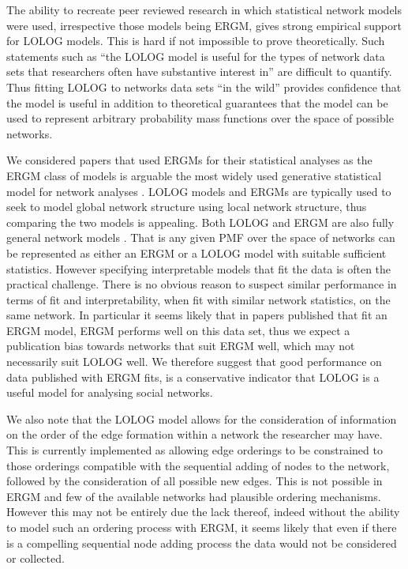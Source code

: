 \documentclass[
]{statsoc}
\begin{document}
The ability to recreate peer reviewed research in which statistical
network models were used, irrespective those models being ERGM, gives
strong empirical support for LOLOG models. This is hard if not
impossible to prove theoretically. Such statements such as ``the LOLOG
model is useful for the types of network data sets that researchers
often have substantive interest in'' are difficult to quantify. Thus
fitting LOLOG to networks data sets ``in the wild'' provides confidence
that the model is useful in addition to theoretical guarantees that the
model can be used to represent arbitrary probability mass functions over
the space of possible networks.

We considered papers that used ERGMs for their statistical analyses as
the ERGM class of models is arguable the most widely used generative
statistical model for network analyses \citep{Amati2018}. LOLOG models
and ERGMs are typically used to seek to model global network structure
using local network structure, thus comparing the two models is
appealing. Both LOLOG and ERGM are also fully general network models
\citep{Fellows2018}. That is any given PMF over the space of networks
can be represented as either an ERGM or a LOLOG model with suitable
sufficient statistics. However specifying interpretable models that fit
the data is often the practical challenge. There is no obvious reason to
suspect similar performance in terms of fit and interpretability, when
fit with similar network statistics, on the same network. In particular
it seems likely that in papers published that fit an ERGM model, ERGM
performs well on this data set, thus we expect a publication bias
towards networks that suit ERGM well, which may not necessarily suit
LOLOG well. We therefore suggest that good performance on data published
with ERGM fits, is a conservative indicator that LOLOG is a useful model
for analysing social networks.

We also note that the LOLOG model allows for the consideration of
information on the order of the edge formation within a network the
researcher may have. This is currently implemented as allowing edge
orderings to be constrained to those orderings compatible with the
sequential adding of nodes to the network, followed by the consideration
of all possible new edges. This is not possible in ERGM and few of the
available networks had plausible ordering mechanisms. However this may
not be entirely due the lack thereof, indeed without the ability to
model such an ordering process with ERGM, it seems likely that even if
there is a compelling sequential node adding process the data would not
be considered or collected.
\end{document}
